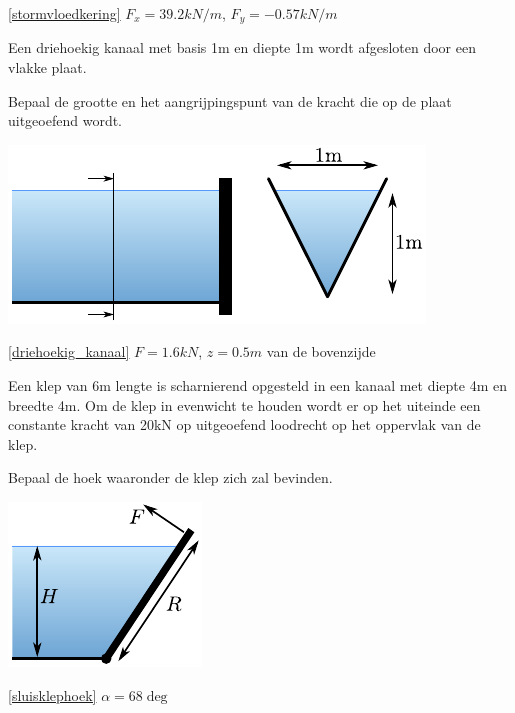 \begin{antwoord}{\ref{stormvloedkering}}
	$F_x = 39.2\unit{kN/m}$, $F_y = -0.57\unit{kN/m}$
\end{antwoord}
\begin{toepassing}
	\label{driehoekig_kanaal}
Een driehoekig kanaal met basis 1m en diepte 1m wordt afgesloten door een vlakke plaat.
		
Bepaal de grootte en het aangrijpingspunt van de kracht die op de plaat uitgeoefend wordt.

	\centering
	\includegraphics{fig/hydrostatica/driehoekig_kanaal}
\end{toepassing}
\begin{antwoord}{\ref{driehoekig_kanaal}}
	$F = 1.6\unit{kN}$, $z=0.5\unit{m}$ van de bovenzijde
\end{antwoord}
\begin{toepassing}
	\label{sluisklephoek}
Een klep van 6m lengte is scharnierend opgesteld in een kanaal met diepte 4m en breedte 4m. Om de klep in evenwicht te houden wordt er op het uiteinde een constante kracht van 20kN op uitgeoefend loodrecht op het oppervlak van de klep.
		
Bepaal de hoek waaronder de klep zich zal bevinden.

	\centering
	\includegraphics{fig/hydrostatica/sluisklephoek}
\end{toepassing}
\begin{antwoord}{\ref{sluisklephoek}}
	$\alpha = 68\deg$ 
\end{antwoord}	
